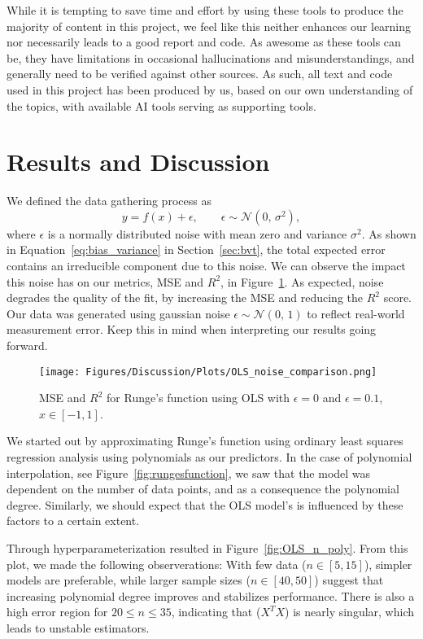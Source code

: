 \documentclass[amssymb,twocolumn,aps]{revtex4}
\begin{document}
While it is tempting to save time and effort by using these tools to produce the majority of content in this project, we feel like this neither enhances our learning nor necessarily leads to a good report and code. As awesome as these tools can be, they have limitations in occasional hallucinations and misunderstandings, and generally need to be verified against other sources. As such, all text and code used in this project has been produced by us, based on our own understanding of the topics, with available AI tools serving as supporting tools.



\section{Results and Discussion}\label{section:results}
We defined the data gathering process as $$y= f(x) + \epsilon, \qquad \epsilon \sim \mathcal{N}(0,\,\sigma^2),$$
where $\epsilon$ is a normally distributed noise with mean zero and variance $\sigma^2$. As shown in Equation~\ref{eq:bias_variance} in Section~\ref{sec:bvt}, the total expected error contains an irreducible component due to this noise. We can observe the impact this noise has on our metrics, MSE and $R^2$, in  Figure~\ref{fig:noisecomp}. As expected, noise degrades the quality of the fit, by increasing the MSE and reducing the $R^2$ score. Our data was generated using gaussian noise $\epsilon \sim \mathcal{N}(0,\,1)$ to reflect real-world measurement error. Keep this in mind when interpreting our results going forward.

\begin{figure}[h]
    \centering
    \texttt{[image: Figures/Discussion/Plots/OLS\_noise\_comparison.png]}
    \caption{MSE and $R^2$ for Runge's function using OLS with $\epsilon = 0$ and $\epsilon = 0.1$, $x\in[-1,1]$.}
    \label{fig:noisecomp}
\end{figure}

We started out by approximating Runge's function using ordinary least squares regression analysis using polynomials as our predictors. In the case of polynomial interpolation, see Figure~\ref{fig:rungesfunction}, we saw that the model was dependent on the number of data points, and as a consequence the polynomial degree. Similarly, we should expect that the OLS model's is influenced by these factors to a certain extent.

Through hyperparameterization resulted in Figure~\ref{fig:OLS_n_poly}. From this plot, we made the following observerations: With few data ($n\in [5,15]$), simpler models are preferable, while larger sample sizes  ($n\in[40,50]$) suggest that increasing polynomial degree improves and stabilizes performance. There is also a high error region for $20\leq n \leq 35$, indicating that ($X^TX$) is nearly singular, which leads to unstable estimators.
\end{document}
